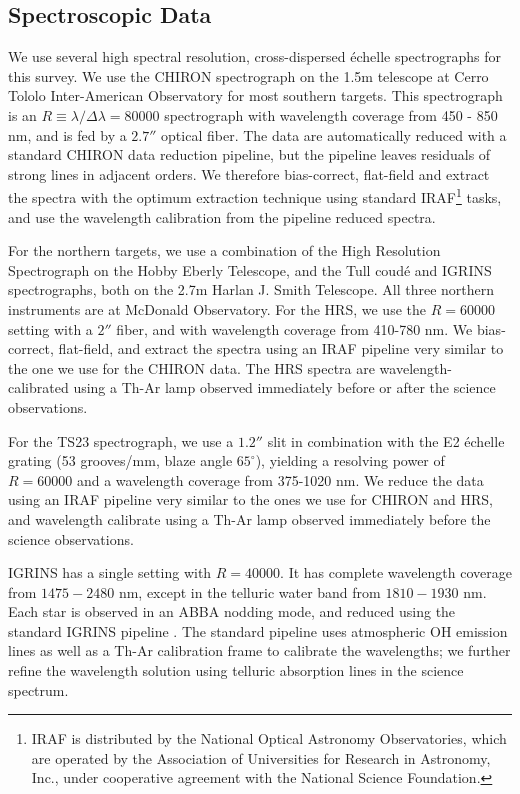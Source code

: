 \subsection{Spectroscopic Data}
\label{paper6_subsec:specdata}
We use several high spectral resolution, cross-dispersed \'echelle spectrographs for this survey. We use the CHIRON spectrograph \citep{CHIRON} on the 1.5m telescope at Cerro Tololo Inter-American Observatory for most southern targets. This spectrograph is an $R\equiv \lambda / \Delta \lambda = 80000$ spectrograph with wavelength coverage from 450 - 850 nm, and is fed by a $2.7''$ optical fiber. The data are automatically reduced with a standard CHIRON data reduction pipeline, but the pipeline leaves residuals of strong lines in adjacent orders. We therefore bias-correct, flat-field and extract the spectra with the optimum extraction technique \citep{Horne1986} using standard IRAF\footnote{IRAF is distributed by the National Optical Astronomy Observatories, which are operated by the Association of Universities for Research in Astronomy, Inc., under cooperative agreement with the National Science Foundation.} tasks, and use the wavelength calibration from the pipeline reduced spectra.

For the northern targets, we use a combination of the High Resolution Spectrograph \citep[HRS,][]{HRS} on the Hobby Eberly Telescope, and the Tull coud\'e \citep[TS23,][]{TS23} and IGRINS \citep{IGRINS} spectrographs, both on the 2.7m Harlan J. Smith Telescope. All three northern instruments are at McDonald Observatory. For the HRS, we use the $R = 60000$ setting with a $2''$ fiber, and with wavelength coverage from 410-780 nm. We bias-correct, flat-field, and extract the spectra using an IRAF pipeline very similar to the one we use for the CHIRON data. The HRS spectra are wavelength-calibrated using a Th-Ar lamp observed immediately before or after the science observations.

For the TS23 spectrograph, we use a $1.2''$ slit in combination with the E2 \'echelle grating (53 grooves/mm, blaze angle $65^{\circ}$), yielding a resolving power of $R=60000$ and a wavelength coverage from 375-1020 nm. We reduce the data using an IRAF pipeline very similar to the ones we use for CHIRON and HRS, and wavelength calibrate using a Th-Ar lamp observed immediately before the science observations.

IGRINS has a single setting with $R = 40000$. It has complete wavelength coverage from $1475-2480$ nm, except in the telluric water band from $1810 - 1930$ nm. Each star is observed in an ABBA nodding mode, and reduced using the standard IGRINS pipeline \citep{IGRINS_plp_v2}. The standard pipeline uses atmospheric OH emission lines as well as a Th-Ar calibration frame to calibrate the wavelengths; we further refine the wavelength solution using telluric absorption lines in the science spectrum.

